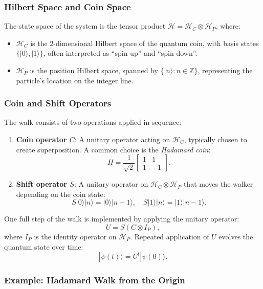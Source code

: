 \documentclass[11pt]{article}
\theoremstyle{definition}
\begin{document}
\subsubsection*{Hilbert Space and Coin Space}

The state space of the system is the tensor product \( \mathcal{H} = \mathcal{H}_C \otimes \mathcal{H}_P \), where:
\begin{itemize}
    \item \( \mathcal{H}_C \) is the 2-dimensional Hilbert space of the quantum coin, with basis states \( \{|0\rangle, |1\rangle\} \), often interpreted as ``spin up'' and ``spin down''.
    \item \( \mathcal{H}_P \) is the position Hilbert space, spanned by \( \{|n\rangle : n \in \mathbb{Z}\} \), representing the particle's location on the integer line.
\end{itemize}

\subsubsection*{Coin and Shift Operators}

The walk consists of two operations applied in sequence:
\begin{enumerate}
    \item \textbf{Coin operator \( C \)}: A unitary operator acting on \( \mathcal{H}_C \), typically chosen to create superposition. A common choice is the \textit{Hadamard coin}:
    \[
    H = \frac{1}{\sqrt{2}} \begin{bmatrix}
    1 & 1 \\
    1 & -1
    \end{bmatrix}.
    \]
    \item \textbf{Shift operator \( S \)}: A unitary operator on \( \mathcal{H}_C \otimes \mathcal{H}_P \) that moves the walker depending on the coin state:
    \[
    S|0\rangle|n\rangle = |0\rangle|n + 1\rangle, \quad
    S|1\rangle|n\rangle = |1\rangle|n - 1\rangle.
    \]
\end{enumerate}

One full step of the walk is implemented by applying the unitary operator:
\[
U = S (C \otimes I_P),
\]
where \( I_P \) is the identity operator on \( \mathcal{H}_P \). Repeated application of \( U \) evolves the quantum state over time:
\[
|\psi(t)\rangle = U^t |\psi(0)\rangle.
\]

\subsubsection*{Example: Hadamard Walk from the Origin}
\end{document}
